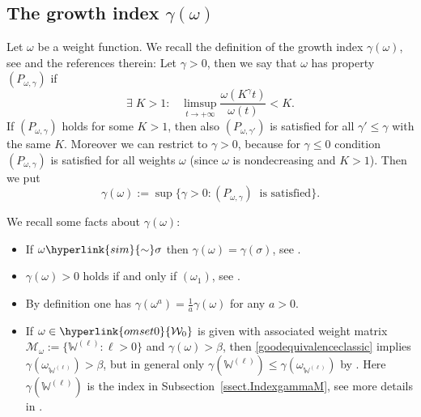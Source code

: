 \documentclass[11pt,a4paper]{article}
\theoremstyle{plain}
\theoremstyle{definition}
\newcommand{\red}[1]{{\color{red}#1}}
\newcommand{\W}{\mathbb{W}}
\begin{document}
\subsection{The growth index $\gamma(\omega)$}\label{ssect.IndexGammaOmega}

Let $\omega$ be a weight function. We recall the definition of the growth index $\gamma(\omega)$, see \cite[Sect. 2.3]{index} and the references therein: Let $\gamma>0$, then we say that $\omega$ has property $(P_{\omega,\gamma})$ if
\begin{equation*}\label{newindex1}
	 \exists\;K>1:\;\;\;\limsup_{t\rightarrow+\infty}\frac{\omega(K^{\gamma}t)}{\omega(t)}<K.
\end{equation*}
If $(P_{\omega,\gamma})$ holds for some $K>1$, then also $(P_{\omega,\gamma'})$ is satisfied for all $\gamma'\le\gamma$ with the same $K$. Moreover we can restrict to $\gamma>0$, because for $\gamma\le 0$ condition $(P_{\omega,\gamma})$ is satisfied for all weights $\omega$ (since $\omega$ is nondecreasing and $K>1$). Then we put
\begin{equation*}%
	\gamma(\omega):=\sup\{\gamma>0: (P_{\omega,\gamma})\;\;\text{is satisfied}\}.
\end{equation*}

We recall some facts about $\gamma(\omega)$:

\begin{itemize}
	\item[$(i)$] If $\omega\hyperlink{sim}{\sim}\sigma$ then $\gamma(\omega)=\gamma(\sigma)$, see \cite[Rem. 2.12]{index}.
	
	\item[$(ii)$] $\gamma(\omega)>0$ holds if and only if \hyperlink{om1}{$(\omega_1)$}, see \cite[Cor. 2.14]{index}.
	
	
	\item[$(iii)$] By definition one has $\gamma(\omega^a)=\frac{1}{a}\gamma(\omega)$ for any $a>0$.
	
	\item[$(iv)$] If $\omega\in\hyperlink{omset0}{\mathcal{W}_0}$ is given with associated weight matrix $\mathcal{M}_{\omega}:=\{\W^{(\ell)}: \ell>0\}$ and $\gamma(\omega)>\beta$, then \eqref{goodequivalenceclassic} implies $\gamma(\omega_{\W^{(\ell)}})>\beta$, but in general only $\gamma(\W^{(\ell)})\le\gamma(\omega_{\W^{(\ell)}})$ by \cite[Cor. 4.6 $(i)$]{index}. Here $\gamma(\W^{(\ell)})$ is the index in Subsection~\ref{ssect.IndexgammaM}, see more details in \cite[Sect. 3]{index}.
\end{itemize}
\end{document}

